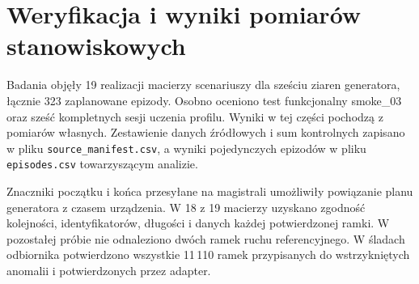 \section{Weryfikacja i wyniki pomiarów stanowiskowych}

Badania objęły 19 realizacji macierzy scenariuszy dla sześciu ziaren generatora,
łącznie 323 zaplanowane epizody. Osobno oceniono test funkcjonalny smoke\_03
oraz sześć kompletnych sesji uczenia profilu. Wyniki w tej części pochodzą
z pomiarów własnych. Zestawienie danych źródłowych i sum kontrolnych zapisano
w pliku \texttt{source\_manifest.csv}, a wyniki pojedynczych epizodów
w pliku \texttt{episodes.csv} towarzyszącym analizie.

Znaczniki początku i końca przesyłane na magistrali umożliwiły powiązanie
planu generatora z czasem urządzenia. W 18 z 19 macierzy uzyskano zgodność
kolejności, identyfikatorów, długości i danych każdej potwierdzonej ramki.
W pozostałej próbie nie odnaleziono dwóch ramek ruchu referencyjnego.
W śladach odbiornika potwierdzono wszystkie 11\,110 ramek przypisanych
do wstrzykniętych anomalii i potwierdzonych przez adapter.

